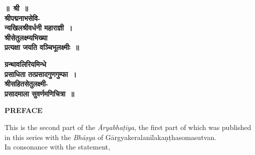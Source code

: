 \documentclass[11pt, openany]{book}
\begin{document}
\newpage

\pagestyle{empty}

\begin{center}
\Large\textbf{॥~श्री~॥}\\
\textbf{श्रीपद्मनाभसेवि-\\न्यखिलश्रीवर्धनी महाराज्ञी~। \\ श्रीसेतुलक्ष्म्यभिख्या \\ प्रत्यक्षा जयति वञ्चिभूलक्ष्मीः~॥}

\vspace{.5cm}

\textbf{ग्रन्थावलिरियमिन्धे \\ प्रसाधिता तत्प्रसादगुणगुम्फा~।\\ श्रीसहितसेतुलक्ष्मी-\\ प्रसादमाला सुवर्णमणिचित्रा~॥}
\end{center}



\newpage

\begin{center}
\textbf{\en PREFACE}
\end{center}
{\en This is the second part of the \emph{Āryabhaṭīya}, the first part of which was published in this series with the \emph{Bhāṣya} of Gārgyakeralanīlakaṇṭhasomasutvan.\\

In consonance with the statement,} 
\end{document}
